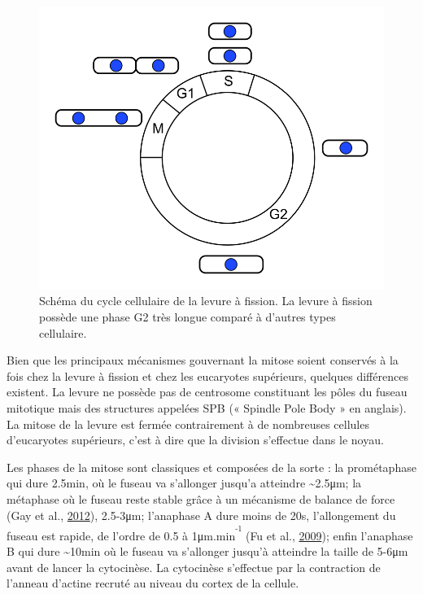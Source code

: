 \documentclass[12pt,a4paper,twoside,openright]{book}
\begin{document}
\begin{figure}[htbp]
\centering
\includegraphics{figures/intro/pombe_cell_cycle.png}
\caption[Schéma du cycle cellulaire de la levure à fission]{\label{fig:pombe-cell-cycle}Schéma
du cycle cellulaire de la levure à fission. La levure à fission possède
une phase G2 très longue comparé à d'autres types cellulaire.}
\end{figure}

Bien que les principaux mécanismes gouvernant la mitose soient conservés
à la fois chez la levure à fission et chez les eucaryotes supérieurs,
quelques différences existent. La levure ne possède pas de centrosome
constituant les pôles du fuseau mitotique mais des structures appelées
SPB (« Spindle Pole Body » en anglais). La mitose de la levure est
fermée contrairement à de nombreuses cellules d'eucaryotes supérieurs,
c'est à dire que la division s'effectue dans le noyau.

Les phases de la mitose sont classiques et composées de la sorte : la
prométaphase qui dure 2.5min, où le fuseau va s'allonger jusqu'a
atteindre \textasciitilde{}2.5μm; la métaphase où le fuseau reste stable
grâce à un mécanisme de balance de force (Gay et al.,
\hyperref[ref-Gay2012a]{2012}), 2.5-3μm; l'anaphase A dure moins de 20s,
l'allongement du fuseau est rapide, de l'ordre de 0.5 à
1μm.min\textsuperscript{\textsuperscript{-1}} (Fu et al.,
\hyperref[ref-Fu2009]{2009}); enfin l'anaphase B qui dure
\textasciitilde{}10min où le fuseau va s'allonger jusqu'à atteindre la
taille de 5-6μm avant de lancer la cytocinèse. La cytocinèse s'effectue
par la contraction de l'anneau d'actine recruté au niveau du cortex de
la cellule.
\end{document}
